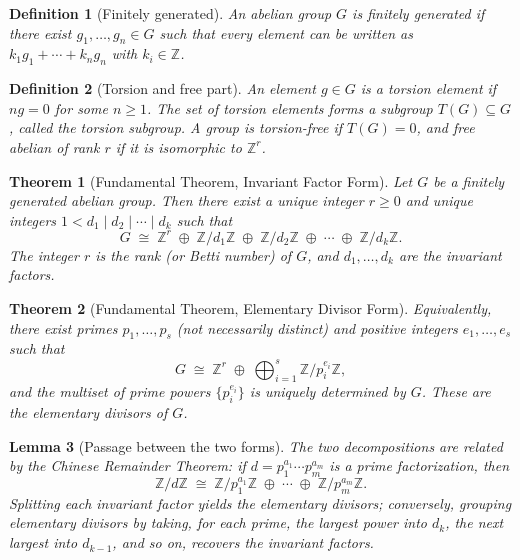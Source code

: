 \documentclass{article}
\newtheorem{definition}{Definition}
\newtheorem{theorem}{Theorem}
\newtheorem{lemma}[theorem]{Lemma}
\begin{document}
\begin{definition}[Finitely generated]
An abelian group $G$ is \emph{finitely generated} if there exist $g_1, \dots, g_n \in G$ such that every element can be written as $k_1 g_1 + \cdots + k_n g_n$ with $k_i \in \mathbb{Z}$.
\end{definition}

\begin{definition}[Torsion and free part]
An element $g \in G$ is a \emph{torsion element} if $ng = 0$ for some $n \ge 1$. The set of torsion elements forms a subgroup $T(G) \subseteq G$, called the \emph{torsion subgroup}. A group is \emph{torsion-free} if $T(G) = 0$, and \emph{free abelian of rank $r$} if it is isomorphic to $\mathbb{Z}^r$.
\end{definition}

\begin{theorem}[Fundamental Theorem, Invariant Factor Form]
Let $G$ be a finitely generated abelian group. Then there exist a unique integer $r \ge 0$ and unique integers $1 < d_1 \mid d_2 \mid \cdots \mid d_k$ such that
\[
    G \;\cong\; \mathbb{Z}^r \;\oplus\; \mathbb{Z}/d_1\mathbb{Z} \;\oplus\; \mathbb{Z}/d_2\mathbb{Z} \;\oplus\; \cdots \;\oplus\; \mathbb{Z}/d_k\mathbb{Z}.
\]
The integer $r$ is the \emph{rank} (or \emph{Betti number}) of $G$, and $d_1, \dots, d_k$ are the \emph{invariant factors}.
\end{theorem}

\begin{theorem}[Fundamental Theorem, Elementary Divisor Form]
Equivalently, there exist primes $p_1, \dots, p_s$ (not necessarily distinct) and positive integers $e_1, \dots, e_s$ such that
\[
    G \;\cong\; \mathbb{Z}^r \;\oplus\; \bigoplus_{i=1}^{s} \mathbb{Z}/p_i^{e_i}\mathbb{Z},
\]
and the multiset of prime powers $\{p_i^{e_i}\}$ is uniquely determined by $G$. These are the \emph{elementary divisors} of $G$.
\end{theorem}

\begin{lemma}[Passage between the two forms]
The two decompositions are related by the Chinese Remainder Theorem: if $d = p_1^{a_1} \cdots p_m^{a_m}$ is a prime factorization, then
\[
    \mathbb{Z}/d\mathbb{Z} \;\cong\; \mathbb{Z}/p_1^{a_1}\mathbb{Z} \;\oplus\; \cdots \;\oplus\; \mathbb{Z}/p_m^{a_m}\mathbb{Z}.
\]
Splitting each invariant factor yields the elementary divisors; conversely, grouping elementary divisors by taking, for each prime, the largest power into $d_k$, the next largest into $d_{k-1}$, and so on, recovers the invariant factors.
\end{lemma}
\end{document}
